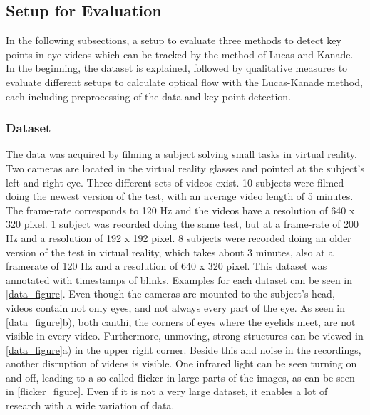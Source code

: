 \documentclass[Bachelorarbeit.tex]{subfiles}
\begin{document}
\subsection{Setup for Evaluation}
\label{setup}
In the following subsections, a setup to evaluate three methods to detect key points in eye-videos which can be tracked by the method of Lucas and Kanade. In the beginning, the dataset is explained, followed by qualitative measures to evaluate different setups to calculate optical flow with the Lucas-Kanade method, each including preprocessing of the data and key point detection. 
\subsubsection{Dataset}
\label{dataset}
The data was acquired by filming a subject solving small tasks in virtual reality. Two cameras are located in the virtual reality glasses and pointed at the subject's left and right eye. Three different sets of videos exist. 10 subjects were filmed doing the newest version of the test, with an average video length of 5 minutes. The frame-rate corresponds to 120 Hz and the videos have a resolution of 640 x 320 pixel. 1 subject was recorded doing the same test, but at a frame-rate of 200 Hz and a resolution of 192 x 192 pixel. 8 subjects were recorded doing an older version of the test in virtual reality, which takes about 3 minutes, also at a framerate of 120 Hz and a resolution of 640 x 320 pixel. This dataset was annotated with timestamps of blinks. Examples for each dataset can be seen in \autoref{data_figure}. Even though the cameras are mounted to the subject's head, videos contain not only eyes, and not always every part of the eye. As seen in \autoref{data_figure}b), both canthi, the corners of eyes where the eyelids meet, are not visible in every video. Furthermore, unmoving, strong structures can be viewed in \autoref{data_figure}a) in the upper right corner. Beside this and noise in the recordings, another disruption of videos is visible. One infrared light can be seen turning on and off, leading to a so-called flicker in large parts of the images, as can be seen in \autoref{flicker_figure}. 
Even if it is not a very large dataset, it enables a lot of research with a wide variation of data.
\end{document}
